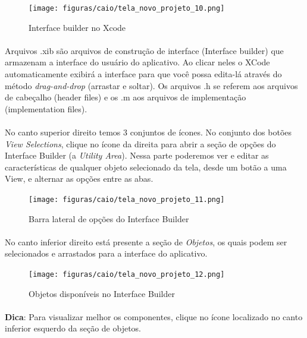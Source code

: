 \documentclass[a4paper,12pt,brazil,doubleside]{book}
\begin{document}
\begin{singlespace}
\begin{figure}[H]
  \centering
  \texttt{[image: figuras/caio/tela\_novo\_projeto\_10.png]}
  \caption{Interface builder no Xcode}
  \label{fig:a}
\end{figure}

\paragraph{}Arquivos .xib são arquivos de construção de interface (Interface builder) que armazenam a interface do usuário do aplicativo. Ao clicar neles o XCode automaticamente exibirá a interface para que você possa edita-lá através do método \emph{drag-and-drop} (arrastar e soltar).
Os arquivos .h se referem aos arquivos de cabeçalho (header files) e os .m aos arquivos de implementação (implementation files).

\paragraph{}No canto superior direito temos 3 conjuntos de ícones. No conjunto dos botões \emph{View Selections}, clique no ícone da direita para abrir a seção de opções do Interface Builder (a \emph{Utility Area}). Nessa parte poderemos ver e editar as características de qualquer objeto selecionado da tela, desde um botão a uma View, e alternar as opções entre as abas.

\begin{figure}[H]
  \centering
  \texttt{[image: figuras/caio/tela\_novo\_projeto\_11.png]}
  \caption{Barra lateral de opções do Interface Builder}
  \label{fig:a}
\end{figure}

\paragraph{}No canto inferior direito está presente a seção de \emph{Objetos}, os quais podem ser selecionados e arrastados para a interface do aplicativo.

\begin{figure}[H]
  \centering
  \texttt{[image: figuras/caio/tela\_novo\_projeto\_12.png]}
  \caption{Objetos disponíveis no Interface Builder}
  \label{fig:a}
\end{figure}

\begin{framed}
\paragraph{}\textbf{Dica}: Para visualizar melhor os componentes, clique no ícone localizado no canto inferior esquerdo da seção de objetos.
\end{framed}


\end{singlespace}
\end{document}
